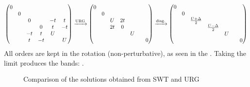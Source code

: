 \documentclass[12pt]{article}
\begin{document}
\begin{gather*}
\begin{pmatrix}
	0 &&&&&\\
	& 0&&&&\\
	&& 0 && -t & t \\
	&&& 0 & t & -t \\
	&& -t & t & U & \\
	&& t & -t && U \\
\end{pmatrix}
\xrightarrow{\text{URG}}
\begin{pmatrix}
	0 &&&&& \\
	& 0 &&&& \\
	&& U & 2t && \\
	&& 2t & 0 && \\
	&&&& U & \\
	&&&&& & 0 \\
\end{pmatrix}
\xrightarrow{\text{diag.}}
\begin{pmatrix}
	0 &&&&& \\
	& 0 &&&& \\
	&& \frac{U+\Delta}{2} &&& \\
	&&& \frac{U-\Delta}{2} && \\
	&&&& U & \\
	&&&&& & 0 \\
\end{pmatrix}
\end{gather*}
All orders are kept in the rotation (non-perturbative), as seen in the . Taking the limit  produces the bands: .

\newpage

\begin{figure}[tb!h]
\caption{Comparison of the solutions obtained from SWT and URG}
\end{figure}
\end{document}

